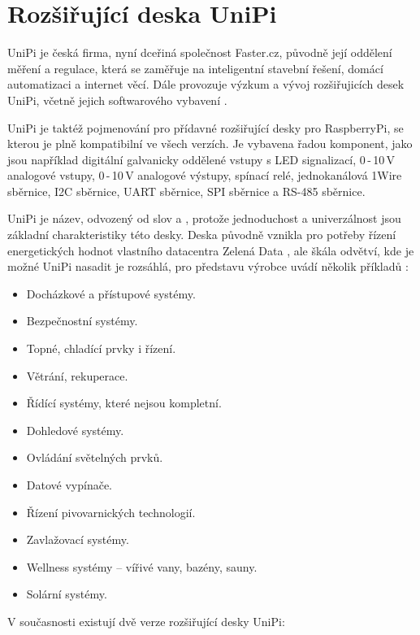 \chapter{Rozšiřující deska UniPi}
\label{KapUnipi}

UniPi je česká firma, nyní dceřiná společnost Faster.cz, původně její oddělení měření a regulace, která se zaměřuje na inteligentní stavební řešení, domácí automatizaci a internet věcí. Dále provozuje výzkum a vývoj rozšiřujicích desek UniPi, včetně jejich softwarového vybavení \cite{UniPi}.

UniPi je taktéž pojmenování pro přídavné rozšiřující desky pro RaspberryPi, se kterou je plně kompatibilní ve všech verzích. Je vybavena řadou komponent, jako jsou například digitální galvanicky oddělené vstupy s LED signalizací, 0\,-\,10\,V analogové vstupy, 0\,-\,10\,V analogové výstupy, spínací relé, jednokanálová 1Wire sběrnice, I2C sběrnice, UART sběrnice, SPI sběrnice a RS-485 sběrnice.

UniPi je název, odvozený od slov  a , protože jednoduchost a univerzálnost jsou základní charakteristiky této desky. Deska původně vznikla pro potřeby řízení energetických hodnot vlastního datacentra Zelená Data \cite{ZelenaData}, ale škála odvětví, kde je možné UniPi nasadit je rozsáhlá, pro představu výrobce uvádí několik příkladů \cite{UniPi}:
\begin{itemize}
	\item Docházkové a přístupové systémy.
	\item Bezpečnostní systémy.
	\item Topné, chladící prvky i řízení.
	\item Větrání, rekuperace.
	\item Řídící systémy, které nejsou kompletní.
	\item Dohledové systémy.
	\item Ovládání světelných prvků.
	\item Datové vypínače.
	\item Řízení pivovarnických technologií.
	\item Zavlažovací systémy.
	\item Wellness systémy – vířivé vany, bazény, sauny.
	\item Solární systémy.
\end{itemize}

\vspace{5mm}
\noindent
 V současnosti existují dvě verze rozšiřující desky UniPi:


